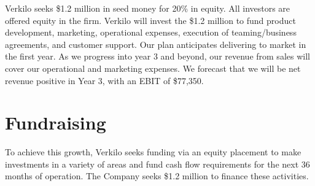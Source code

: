 \documentclass[10pt,openany]{book}
\begin{document}
Verkilo seeks \$1.2 million in seed money for 20\% in equity. All
investors are offered equity in the firm. Verkilo will invest the \$1.2
million to fund product development, marketing, operational expenses,
execution of teaming/business agreements, and customer support. Our plan
anticipates delivering to market in the first year. As we progress into
year 3 and beyond, our revenue from sales will cover our operational and
marketing expenses. We forecast that we will be net revenue positive in
Year 3, with an EBIT of \$77,350.

\hypertarget{fundraising}{%
\section{Fundraising}\label{fundraising}}

To achieve this growth, Verkilo seeks funding via an equity placement to
make investments in a variety of areas and fund cash flow requirements
for the next 36 months of operation. The Company seeks \$1.2 million to
finance these activities.
\end{document}

